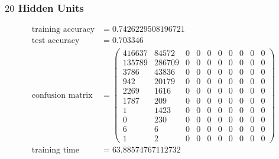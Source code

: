 \documentclass[11pt]{article}
\begin{document}
\subsubsection{$20$ Hidden Units}
\begin{equation}
  \begin{split}
    \text{training accuracy} &= 0.7426229508196721\\
    \text{test accuracy} &= 0.703346\\
    \text{confusion matrix} &=
    \begin{pmatrix}
      416637 & 84572  & 0 & 0 & 0 & 0 & 0 & 0 & 0 & 0 \\
      135789 & 286709 & 0 & 0 & 0 & 0 & 0 & 0 & 0 & 0 \\
      3786   & 43836  & 0 & 0 & 0 & 0 & 0 & 0 & 0 & 0 \\
      942    & 20179  & 0 & 0 & 0 & 0 & 0 & 0 & 0 & 0 \\
      2269   & 1616   & 0 & 0 & 0 & 0 & 0 & 0 & 0 & 0 \\
      1787   & 209    & 0 & 0 & 0 & 0 & 0 & 0 & 0 & 0 \\
      1      & 1423   & 0 & 0 & 0 & 0 & 0 & 0 & 0 & 0 \\
      0      & 230    & 0 & 0 & 0 & 0 & 0 & 0 & 0 & 0 \\
      6      & 6      & 0 & 0 & 0 & 0 & 0 & 0 & 0 & 0 \\
      1      & 2      & 0 & 0 & 0 & 0 & 0 & 0 & 0 & 0
    \end{pmatrix}\\
    \text{training time} &= 63.88574767112732
  \end{split}
\end{equation}
\end{document}
